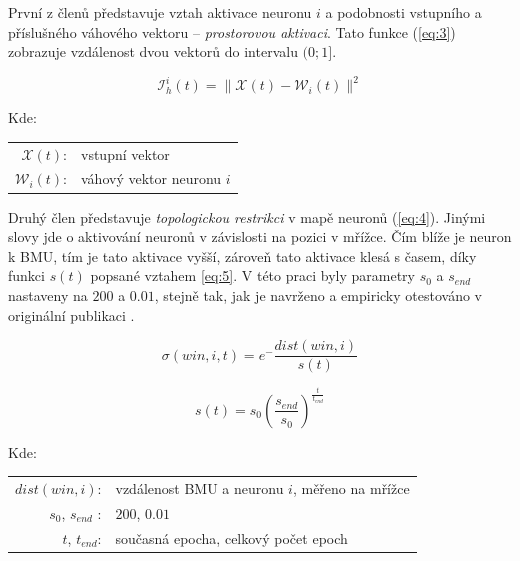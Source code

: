 \documentclass[thesis=M,czech]{FITthesis}[2012/06/26]
\begin{document}
První z členů představuje vztah aktivace neuronu $i$  a podobnosti vstupního a příslušného váhového vektoru -- \textit{prostorovou aktivaci}. Tato funkce (\ref{eq:3}) zobrazuje vzdálenost dvou vektorů do intervalu $(0;1]$.


\vspace{\baselineskip}
\noindent
\begin{minipage}[c]{\textwidth }
\begin{equation} \label{eq:3}
    \mathcal{I}_h^i(t) = \|\mathcal{X}(t)-\mathcal{W}_i(t)\|^2   
\end{equation}

Kde:\\
\hspace*{3em}
\begin{tabular}{rl}
    $\mathcal{X}(t)$:& vstupní vektor \\
    $\mathcal{W}_i(t)$:& váhový vektor neuronu $i$ \\
\end{tabular}
\end{minipage} 
\vspace{\baselineskip}
\noindent

 

Druhý člen představuje \textit{topologickou restrikci} v mapě neuronů (\ref{eq:4}). Jinými slovy jde o aktivování neuronů v závislosti na pozici v mřížce. Čím blíže je neuron k BMU, tím je tato aktivace vyšší, zároveň tato aktivace klesá s časem, díky funkci $s(t)$ popsané vztahem \ref{eq:5}.  
V této praci byly parametry $s_0$ a $s_{end}$ nastaveny na $200$ a $0.01$, stejně tak, jak je navrženo a empiricky otestováno v originální publikaci \cite{hartono14}.


\vspace{\baselineskip}
\noindent
\begin{minipage}[c]{\textwidth }

\begin{equation} \label{eq:4}
    \sigma(win, i, t)=e^-\frac{dist(win, i)}{s(t)}  
\end{equation}

\begin{equation} \label{eq:5}
    {s(t)=s_0(\frac{s_{end}}{s_0})^\frac{t}{t_{end}}}  
\end{equation}

Kde:\\
\hspace*{3em}
\begin{tabular}{rl}
    $dist(win, i)$:& vzdálenost BMU a neuronu $i$, měřeno na mřížce \\
    $s_0$, $s_{end}$ :& $200$, $0.01$ \\
     $t$, $t_{end}$:& současná epocha, celkový počet epoch \\
\end{tabular}
\end{minipage} 
\vspace{\baselineskip}
\noindent
\end{document}
